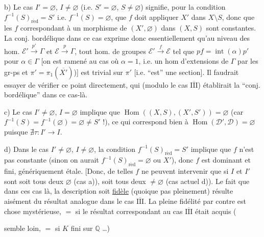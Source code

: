 b) Le cas $I'=\varnothing$, $I\ne\varnothing$ (i.e. $S'=\varnothing$, $S\ne\varnothing$) signifie, pour la condition $f^{-1}(S)_{\mathrm{r\acute ed}}=S'$ i.e. $f^{-1}(S)=\varnothing$, que $f$ doit appliquer $X'$ dans $X\setminus S$,  donc que les $f$ correspondant à un morphisme de $(X',\varnothing)$ dans $(X,S)$ sont constantes.
La conj. bordélique dans ce cas exprime donc  essentiellement qu'au niveau des hom. $\mathcal E'\xrightarrow{p'}\Gamma$ et $\mathcal E\xrightarrow{p}\Gamma$, tout hom. de groupes $\mathcal E'\xrightarrow{f}\mathcal E$ tel que $pf=\operatorname{int}(\alpha)p'$ pour $\alpha\in\Gamma$ [on est ramené au cas où $\alpha=1$,  i.e. un hom d'extensions de $\Gamma$ par les gr-ps  et $\pi'=\pi_1(\overline{X'})$)] est trivial sur $\pi'$ [i.e. ``est'' une section]. Il faudrait essayer de vérifier ce point directement, qui (modulo le cas \uline{$\overline{\mathrm{III}}$}) établirait la ``conj. bordélique'' dans ce cas-là.



c) Le cas $I'\ne\varnothing$, $I=\varnothing$ implique que $\operatorname{Hom}((X,S),(X',S'))=\varnothing$ (car $f^{-1}(S)=f^{-1}(\varnothing)=\varnothing\ne S'$ !), ce qui correspond bien  à $\operatorname{Hom}(\mathcal D',\mathcal D)=\varnothing$ puisque $\nexists\tau:I'\to I$.

d) Dans le cas $I'\ne\varnothing$, $I\ne\varnothing$, la condition $f^{-1}(S)_{\mathrm{r\acute ed}}=S'$ implique que $f$ n'est pas constante (sinon on aurait $f^{-1}(S)_{\mathrm{r\acute ed}}=\varnothing$ ou $X'$), donc $f$ est dominant et fini, génériquement étale. [Donc, de telles $f$ ne  peuvent intervenir que si $I$ et $I'$ sont soit tous deux $\varnothing$ (cas a)), soit tous deux $\ne\varnothing$ (cas actuel d)). Le fait que dans ces cas là, la description  soit \uline{fidèle} (quoique pas pleinement) résulte aisément du résultat analogue dans le cas \uline{$\overline{\mathrm{III}}$}.
La pleine fidélité par contre est chose mystérieuse, $=$ si le résultat correspondant   au cas \uline{$\overline{\mathrm{III}}$} était acquis (



semble loin, $=$ si $K$ fini sur $\mathbb Q$ \ldots)

